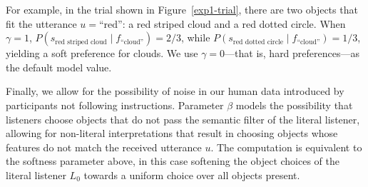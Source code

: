\documentclass[11pt,a4paper]{article}
\begin{document}
For example, in the trial shown in Figure~\ref{exp1-trial}, there are two objects that fit the utterance $u=\text{``red''}$: a red striped cloud and a red dotted circle.
When $\gamma=1$, $P(s_{\textrm{red\ striped\ cloud}}\mid f_{\textrm{``cloud''}}) = 2/3$, while
$P(s_{\textrm{red\ dotted\ circle}}\mid f_{\textrm{``cloud''}})= 1/3$, yielding a soft preference for clouds.
We use $\gamma=0$---that is, hard preferences---as the default model value.



Finally, we allow for the possibility of noise in our human data introduced by participants not following instructions.
Parameter $\beta$ models the possibility that listeners choose objects that do not pass the semantic filter of the literal listener, allowing for non-literal interpretations that result in choosing objects whose features do not match the received utterance $u$. 
The computation is equivalent to the softness parameter above, in this case softening the object choices of the literal listener $L_0$ towards a uniform choice over all objects present. 
\end{document}
